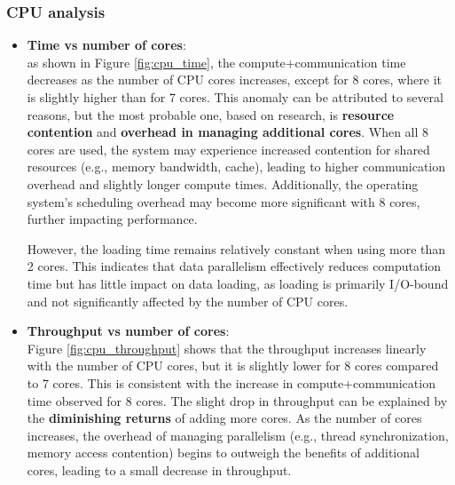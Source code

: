 \documentclass{article}
\begin{document}
\subsubsection{CPU analysis}
\begin{itemize}
    \item \textbf{Time vs number of cores}:\\ as shown in Figure \ref{fig:cpu_time}, the compute+communication time decreases as the number of CPU cores increases, except for 8 cores, where it is slightly higher than for 7 cores. This anomaly can be attributed to several reasons, but the most probable one, based on research, is \textbf{resource contention} and \textbf{overhead in managing additional cores}. When all 8 cores are used, the system may experience increased contention for shared resources (e.g., memory bandwidth, cache), leading to higher communication overhead and slightly longer compute times. Additionally, the operating system's scheduling overhead may become more significant with 8 cores, further impacting performance.
    
    However, the loading time remains relatively constant when using more than 2 cores. This indicates that data parallelism effectively reduces computation time but has little impact on data loading, as loading is primarily I/O-bound and not significantly affected by the number of CPU cores.

    \item \textbf{Throughput vs number of cores}:\\ Figure \ref{fig:cpu_throughput} shows that the throughput increases linearly with the number of CPU cores, but it is slightly lower for 8 cores compared to 7 cores. This is consistent with the increase in compute+communication time observed for 8 cores. The slight drop in throughput can be explained by the \textbf{diminishing returns} of adding more cores. As the number of cores increases, the overhead of managing parallelism (e.g., thread synchronization, memory access contention) begins to outweigh the benefits of additional cores, leading to a small decrease in throughput.
\end{itemize}
\end{document}
